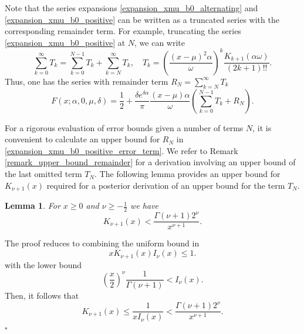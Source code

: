\documentclass[10pt,a4paper,oneside]{article}
\newtheorem{lemma}[theorem]{Lemma}
\newenvironment{proof}{\noindent{\bf Proof:}}{\hfill$\square$}
\numberwithin{equation}{section}
\begin{document}
Note that the series expansions \eqref{expansion_xmu_b0_alternating} and \eqref{expansion_xmu_b0_positive} can be written as a truncated series with the corresponding remainder term. For example, truncating the series \eqref{expansion_xmu_b0_positive} at $N$, we can write
\begin{equation}\label{expansion_xmu_b0_positive_error_term}
\sum_{k=0}^{\infty} T_k = \sum_{k=0}^{N-1} T_k + \sum_{k=N}^{\infty}T_k, \quad T_k = \left(\frac{(x-\mu)^2 \alpha}{\omega}\right)^k \frac{K_{k+1}(\alpha \omega)}{(2k +1)!!}.
\end{equation}
Thus, one has the series with remainder term $R_N = \sum_{k=N}^{\infty}T_k$
\begin{equation}\label{expansion_xmu_b0_positive_with_remainder}
F(x; \alpha, 0, \mu, \delta) = \frac{1}{2} + \frac{\delta e^{\delta \alpha}}{\pi}\frac{(x-\mu)\alpha}{\omega}\left(\sum_{k=0}^{N-1}T_k + R_N\right).
\end{equation}

For a rigorous evaluation of error bounds given a number of terms $N$, it is convenient to calculate an upper bound for $R_N$ in \eqref{expansion_xmu_b0_positive_error_term}. We refer to Remark \ref{remark_upper_bound_remainder} for a derivation involving an upper bound of the last omitted term $T_N$. The following lemma provides an upper bound for $K_{\nu+1}(x)$ required for a posterior derivation of an upper bound for the term $T_N$.
\begin{lemma}\label{lemma_1}
For $x \ge 0$ and $\nu \ge -\frac{1}{2}$ we have
\begin{equation}
K_{\nu + 1}(x) < \frac{\Gamma(\nu + 1)2^{\nu}}{x^{\nu + 1}}.
\end{equation}
\end{lemma}
\begin{proof}
The proof reduces to combining the uniform bound in \cite{Gaunt2016}
\begin{equation}
x K_{\nu + 1}(x) I_{\nu}(x) \le 1.
\end{equation}
with the lower bound \cite{Luke1972}
\begin{equation}
\left(\frac{x}{2}\right)^{\nu}\frac{1}{\Gamma(\nu + 1)} < I_{\nu}(x).
\end{equation}
Then, it follows that
\begin{equation}
K_{\nu + 1}(x) \le \frac{1}{x I_{\nu}(x)} < \frac{\Gamma(\nu + 1)2^{\nu}}{x^{\nu + 1}}.
\end{equation}
\end{proof}
\end{document}
